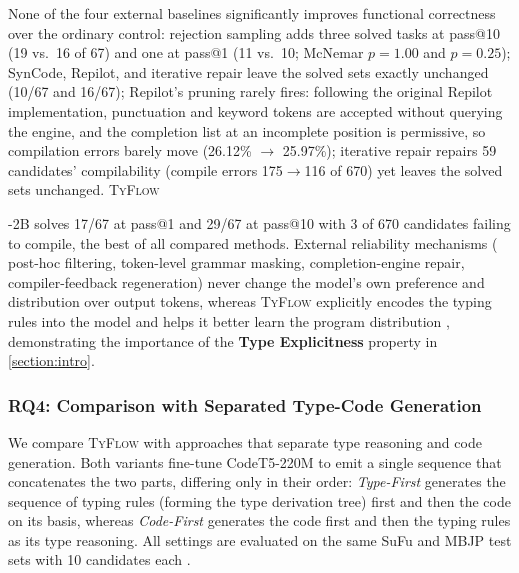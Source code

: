 \documentclass[manuscript,screen]{acmart}
\newcommand{\toolname}[1]{\textsc{#1}}
\newcommand{\mainname}{\toolname{TyFlow}\xspace}
\begin{document}
   {\color{revblue}None of the four external baselines significantly improves functional correctness over the ordinary control:
rejection sampling adds three solved tasks at pass@10 (19 vs.\ 16 of 67) and one at pass@1 (11 vs.\ 10; McNemar $p=1.00$ and $p=0.25$);
SynCode, Repilot, and iterative repair leave the solved sets exactly unchanged (10/67 and 16/67);
Repilot's pruning rarely fires: following the original Repilot implementation, punctuation and keyword tokens are accepted without querying the engine, and the completion list at an incomplete position is permissive, so compilation errors barely move (26.12\% $\to$ 25.97\%);
iterative repair repairs 59 candidates' compilability (compile errors 175$\to$116 of 670) yet leaves the solved sets unchanged.
} \mainname %

  {\color{revblue}-2B solves 17/67 at } pass@1 and  {\color{revblue}29/67 at } pass@10  %
  {\color{revblue}with 3 of 670 candidates failing to compile, the best of all compared methods.
External reliability mechanisms (} post-hoc    {\color{revblue}filtering, token-level grammar masking, completion-engine repair, compiler-feedback regeneration) never change the model's own preference and distribution over output tokens, whereas }\mainname{} {\color{revblue}explicitly encodes the typing rules into the model and helps it better learn the program distribution} , demonstrating the    {\color{revblue}importance of the } \textbf{Type Explicitness}    {\color{revblue}property in~} \autoref{section:intro}.

\subsubsection{RQ4: Comparison with Separated Type-Code Generation}
   {\color{revblue}We } compare \mainname with approaches that separate type reasoning and code generation.
   {\color{revblue}Both variants fine-tune } CodeT5-220M    {\color{revblue}to emit a single sequence that concatenates the two parts, differing only in their order: }\emph{\color{revblue}Type-First} {\color{revblue}generates the sequence } of typing rules (forming the type derivation tree)    {\color{revblue}first and then the code on its basis, whereas }\emph{\color{revblue}Code-First} {\color{revblue}generates the code first and then the } typing rules as its type  %
  {\color{revblue}reasoning.
All settings are evaluated on the same SuFu and MBJP test sets with 10 candidates each} .
\end{document}
